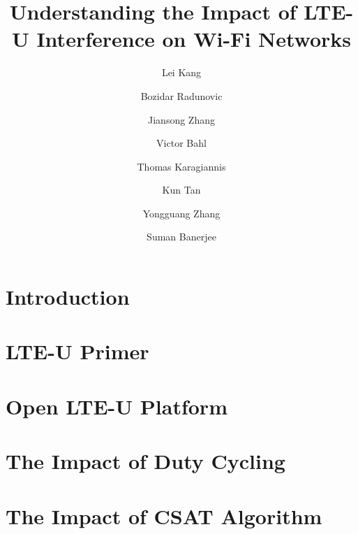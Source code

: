 \documentclass{sig-alternate-10pt}
\begin{document}
\title{Understanding the Impact of LTE-U Interference on Wi-Fi Networks}


\author[1]{Lei Kang}
\author[2]{Bozidar Radunovic}
\author[2]{Jiansong Zhang}
\author[2]{Victor Bahl}
\author[2]{Thomas Karagiannis}
\author[2]{Kun Tan}
\author[2]{Yongguang Zhang}
\author[1]{Suman Banerjee}


\maketitle



\begin{abstract}




\end{abstract}

\section{Introduction}



\section{LTE-U Primer}



\section{Open LTE-U Platform}




\section{The Impact of Duty Cycling}




\section{The Impact of CSAT Algorithm}
\label{sec:csat}

\end{document}
